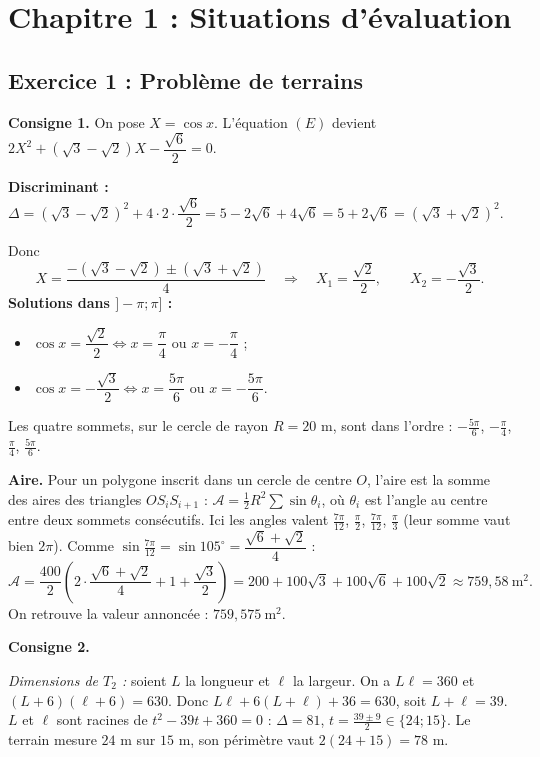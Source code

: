 \section{Chapitre 1 : Situations d'\'evaluation}

\subsection{Exercice 1 : Probl\`eme de terrains}

\textbf{Consigne 1.} On pose $X=\cos x$. L'\'equation $(E)$ devient
$2X^2+(\sqrt3-\sqrt2)X-\dfrac{\sqrt6}{2}=0$.

\medskip\noindent\textbf{Discriminant :}
$\Delta=(\sqrt3-\sqrt2)^2+4\cdot 2\cdot\dfrac{\sqrt6}{2}=5-2\sqrt6+4\sqrt6=5+2\sqrt6=(\sqrt3+\sqrt2)^2$.

\noindent Donc
\[
X=\frac{-(\sqrt3-\sqrt2)\pm(\sqrt3+\sqrt2)}{4}
\quad\Longrightarrow\quad
X_1=\frac{\sqrt2}{2},\qquad X_2=-\frac{\sqrt3}{2}.
\]
\noindent\textbf{Solutions dans $]-\pi;\pi]$ :}
\begin{itemize}
  \item $\cos x=\dfrac{\sqrt2}{2}\iff x=\dfrac{\pi}{4}$ ou $x=-\dfrac{\pi}{4}$ ;
  \item $\cos x=-\dfrac{\sqrt3}{2}\iff x=\dfrac{5\pi}{6}$ ou $x=-\dfrac{5\pi}{6}$.
\end{itemize}
Les quatre sommets, sur le cercle de rayon $R=20$ m, sont dans l'ordre :
$-\frac{5\pi}{6}$, $-\frac{\pi}{4}$, $\frac{\pi}{4}$, $\frac{5\pi}{6}$.

\medskip\noindent\textbf{Aire.} Pour un polygone inscrit dans un cercle de centre $O$, l'aire est la somme
des aires des triangles $OS_iS_{i+1}$ : $\mathcal A=\frac12R^2\sum\sin\theta_i$, o\`u $\theta_i$ est l'angle
au centre entre deux sommets cons\'ecutifs. Ici les angles valent $\frac{7\pi}{12}$, $\frac{\pi}{2}$,
$\frac{7\pi}{12}$, $\frac{\pi}{3}$ (leur somme vaut bien $2\pi$). Comme
$\sin\frac{7\pi}{12}=\sin105^\circ=\dfrac{\sqrt6+\sqrt2}{4}$ :
\[
\mathcal A=\frac{400}{2}\left(2\cdot\frac{\sqrt6+\sqrt2}{4}+1+\frac{\sqrt3}{2}\right)
=200+100\sqrt3+100\sqrt6+100\sqrt2\approx 759{,}58\ \text{m}^2 .
\]
On retrouve la valeur annonc\'ee : $759{,}575\ \text{m}^2$.

\medskip\noindent\textbf{Consigne 2.}

\emph{Dimensions de $T_2$ :} soient $L$ la longueur et $\ell$ la largeur. On a $L\ell=360$ et
$(L+6)(\ell+6)=630$. Donc $L\ell+6(L+\ell)+36=630$, soit $L+\ell=39$.
$L$ et $\ell$ sont racines de $t^2-39t+360=0$ : $\Delta=81$, $t=\frac{39\pm 9}{2}\in\{24;15\}$.
Le terrain mesure $24$ m sur $15$ m, son p\'erim\`etre vaut $2(24+15)=78$ m.

